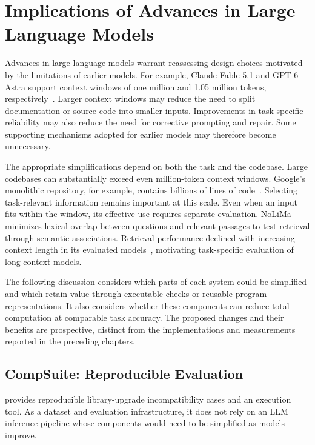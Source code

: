 \section{Implications of Advances in Large Language Models}\label{sec:llm-advances}

Advances in large language models warrant reassessing design choices motivated by the limitations of earlier models. For example, Claude Fable 5.1 and GPT-6 Astra support context windows of one million and 1.05 million tokens, respectively~\cite{anthropic2026models,openai2026models}. Larger context windows may reduce the need to split documentation or source code into smaller inputs. Improvements in task-specific reliability may also reduce the need for corrective prompting and repair. Some supporting mechanisms adopted for earlier models may therefore become unnecessary. 

The appropriate simplifications depend on both the task and the codebase. Large codebases can substantially exceed even million-token context windows. Google's monolithic repository, for example, contains billions of lines of code~\cite{potvin2016google,christopher2025migration}. Selecting task-relevant information remains important at this scale. Even when an input fits within the window, its effective use requires separate evaluation. NoLiMa minimizes lexical overlap between questions and relevant passages to test retrieval through semantic associations. Retrieval performance declined with increasing context length in its evaluated models~\cite{modarressi2025nolima}, motivating task-specific evaluation of long-context models.

The following discussion considers which parts of each system could be simplified and which retain value through executable checks or reusable program representations. It also considers whether these components can reduce total computation at comparable task accuracy. The proposed changes and their benefits are prospective, distinct from the implementations and measurements reported in the preceding chapters.

\subsection{CompSuite: Reproducible Evaluation}
\toolcompsuite provides reproducible library-upgrade incompatibility cases and an execution tool. As a dataset and evaluation infrastructure, it does not rely on an LLM inference pipeline whose components would need to be simplified as models improve.

